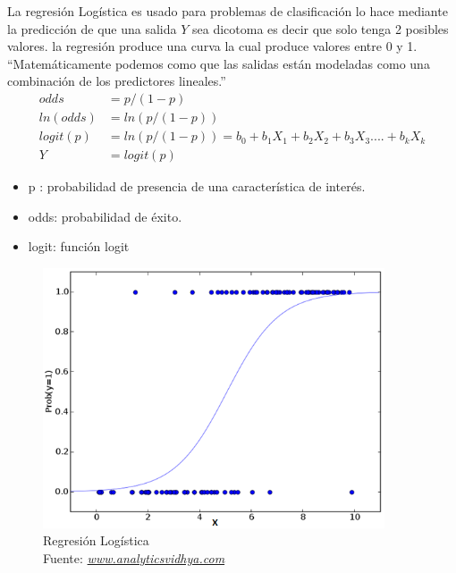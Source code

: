  La regresión Logística es usado para problemas de clasificación lo hace mediante la predicción de que una salida $Y$ sea dicotoma es decir que solo tenga 2 posibles valores.
 la regresión produce una curva la cual produce valores entre 0 y 1.
 \textquotedblleft Matemáticamente podemos como que las salidas están modeladas como una combinación de los predictores lineales.\textquotedblright \cite{WEBSITE:6}
 \begin{equation}
 \label{eq:t}
 \begin{aligned}
 odds &= p/ (1-p)\\ 
 ln(odds) &= ln(p/(1-p))\\      
 logit(p) &= ln(p/(1-p)) = b_{0}+b_{1}X_{1}+b_{2}X_{2}+b_{3}X_{3}....+b_{k}X_{k}\\
 Y &=logit(p)
 \end{aligned}
 \end{equation}
 
 \begin{itemize}
 	\item p : probabilidad de presencia de una característica de interés.
 	\item odds: probabilidad de éxito.
 	\item logit: función logit
 \end{itemize}
 
 \begin{figure}[H]
 	\centering
 	\includegraphics[width=0.9\textwidth]{Figures/logistic.png}
 	\caption{Regresión Logística \\ Fuente:  \href{https://www.analyticsvidhya.com/blog/2017/09/common-machine-learning-algorithms/}{\textit{www.analyticsvidhya.com}}}
 	\label{Regresión Logistica}
 \end{figure} 
